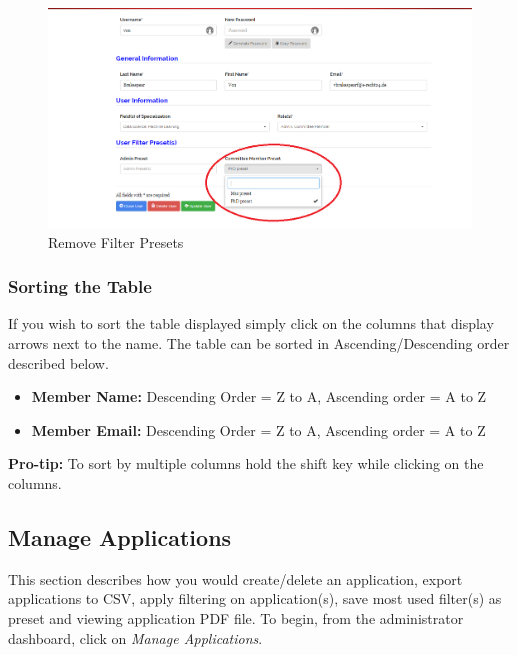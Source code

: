 \documentclass[fontsize=12pt,paper=letter,twoside]{scrartcl}
\begin{document}
\begin{figure}[!htb]
\begin{center}
\includegraphics[width=.99\textwidth]{images/adm/mu/remove_preset.png}
\end{center}
\caption{Remove Filter Presets}
\label{fig:adm/remove_preset}
\end{figure}


\subsubsection{Sorting the Table}
If you wish to sort the table displayed simply click on the columns that display arrows next to the name. The table can be sorted in Ascending/Descending order described below.

\begin{itemize}
\item \textbf{Member Name:} Descending Order = Z to A, Ascending order = A to Z
\item \textbf{Member Email:} Descending Order = Z to A, Ascending order = A to Z
\end{itemize}

\textbf{Pro-tip:} To sort by multiple columns hold the shift key while clicking on the columns.


\newpage
\clearpage
\subsection{Manage Applications} \label{m_appls}
This section describes how you would create/delete an application, export applications to CSV, apply filtering on application(s), save most used filter(s) as preset and viewing application PDF file. To begin, from the administrator dashboard, click on \emph{Manage Applications}.
\end{document}
